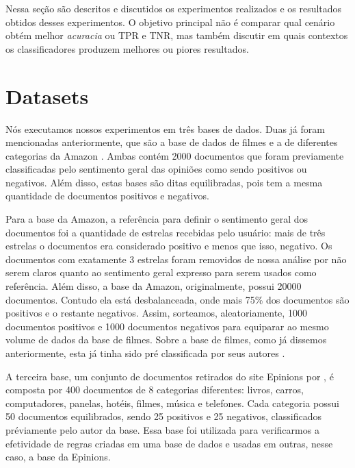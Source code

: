 
Nessa seção são descritos e discutidos os experimentos realizados e os resultados obtidos desses experimentos. O objetivo principal não é comparar qual cenário obtém melhor \textit{acuracia} ou TPR e TNR, mas também discutir em quais contextos os classificadores produzem melhores ou piores resultados.

\section{Datasets}

Nós executamos nossos experimentos em três bases de dados. Duas já foram mencionadas anteriormente, que são a base de dados de filmes \cite{pang2004sentimental} e a de diferentes categorias da Amazon \cite{wang2011latent}. Ambas contém 2000 documentos que foram previamente classificadas pelo sentimento geral das opiniões como sendo positivos ou negativos. Além disso, estas bases são ditas equilibradas, pois tem a mesma quantidade de documentos positivos e negativos. 

Para a base da Amazon, a referência para definir o sentimento geral dos documentos foi a quantidade de estrelas recebidas pelo usuário: mais de três estrelas o documentos era considerado positivo e menos que isso, negativo. Os documentos com exatamente 3 estrelas foram removidos de nossa análise por não serem claros quanto ao sentimento geral expresso para serem usados como referência. Além disso, a base da Amazon, originalmente, possui 20000 documentos. Contudo ela está  desbalanceada, onde mais 75\% dos documentos são positivos e o restante negativos. Assim, sorteamos, aleatoriamente, 1000 documentos positivos e 1000 documentos negativos para equiparar ao mesmo volume de dados da base de filmes. Sobre a base de filmes, como já dissemos anteriormente, esta já tinha sido pré classificada por seus autores \cite{pang2004sentimental}.

A terceira base, um conjunto de documentos retirados do site Epinions por \cite{taboada2011lexicon}, é composta por 400 documentos de 8 categorias diferentes: livros, carros, computadores, panelas, hotéis, filmes, música e telefones. Cada categoria possui 50 documentos equilibrados, sendo 25 positivos e 25 negativos, classificados préviamente pelo autor da base. Essa base foi utilizada para verificarmos a efetividade de regras criadas em uma base de dados e usadas em outras, nesse caso, a base da Epinions. 

